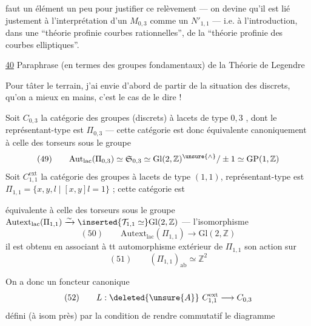 
faut un élément un peu  pour justifier ce relèvement --- on
devine qu'il est lié justement à l'interprétation d'un $M_{0,3}$ comme
un $N'_{1,1}$ --- i.e. à l'introduction, dans une ``théorie profinie
 courbes rationnelles'', de la ``théorie profinie des
courbes elliptiques''.


\uline{40} Paraphrase
(en termes des groupes fondamentaux) de la Théorie de Legendre

Pour tâter le terrain, j'ai envie d'abord de partir de la situation des
 discrets, qu'on a mieux en mains, c'est le cas de le dire !

Soit $C_{0,3}$ la catégorie des groupes (discrets) à lacets de type $0,3$
, dont le
représentant-type est $\Pi_{0,3}$ --- cette catégorie est donc
équivalente canoniquement à celle des torseurs sous le groupe
\[
(49)\qquad
\mathrm{Aut}_{\mathrm{lac}}(\Pi_{0,3})
\simeq\mathfrak S_{0,3}
\simeq\mathrm{Gl}(2,\mathbb Z)^{\unsure{\wedge}}/\pm1
\simeq\mathrm{GP}(1,\mathbb Z)
\]
Soit $C_{1,1}^{\mathrm{ext}}$ la catégorie des groupes à lacets
 de type $(1,1)$,
 représentant-type est
$\Pi_{1,1}=\{x,y,l\mid[x,y]l=1\}$ ; cette catégorie est


équivalente à celle des torseurs sous le groupe
$\mathrm{Autext}_{\mathrm{lac}}(\Pi_{1,1})
\xrightarrow{\sim}
\inserted{\mathcal T_{1,1}\simeq}\mathrm{Gl}(2,\mathbb Z)$
--- l'isomorphisme
\[
(50)\qquad
\mathrm{Autext}_{\mathrm{lac}}(\Pi_{1,1})\longrightarrow
\mathrm{Gl}(2,\mathbb Z)
\]
 il est obtenu en associant à tt automorphisme extérieur de
$\Pi_{1,1}$ son action sur
\[
(51)\qquad
(\Pi_{1,1})_{\mathrm{ab}}\simeq\mathbb Z^2
\]

On a donc un foncteur canonique
\[
(52)\qquad
L:\deleted{\unsure{A}}\ C_{1,1}^{\mathrm{ext}}
\longrightarrow C_{0,3}
\]
défini (à isom  près) par la condition de rendre commutatif
le diagramme

